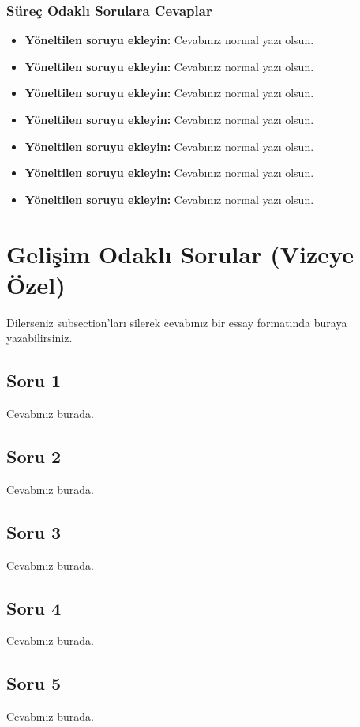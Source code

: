 \documentclass[a4paper,12pt]{article}
\begin{document}
\subsubsection{Süreç Odaklı Sorulara Cevaplar}
\begin{itemize}
  
    \item \textbf{Yöneltilen soruyu ekleyin:} Cevabınız normal yazı olsun.
    \item \textbf{Yöneltilen soruyu ekleyin:} Cevabınız normal yazı olsun.
    \item \textbf{Yöneltilen soruyu ekleyin:} Cevabınız normal yazı olsun.
    \item \textbf{Yöneltilen soruyu ekleyin:} Cevabınız normal yazı olsun.
    \item \textbf{Yöneltilen soruyu ekleyin:} Cevabınız normal yazı olsun.
    \item \textbf{Yöneltilen soruyu ekleyin:} Cevabınız normal yazı olsun.
    \item \textbf{Yöneltilen soruyu ekleyin:} Cevabınız normal yazı olsun.
\end{itemize}



\section{Gelişim Odaklı Sorular (Vizeye Özel)}
Dilerseniz subsection'ları silerek cevabınız bir essay formatında buraya yazabilirsiniz.
\subsection{Soru 1}
Cevabınız burada.

\subsection{Soru 2}
Cevabınız burada.

\subsection{Soru 3}
Cevabınız burada.

\subsection{Soru 4}
Cevabınız burada.

\subsection{Soru 5}
Cevabınız burada.
\end{document}
